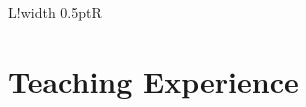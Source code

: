 \documentclass[11pt]{article}
\newcommand\VRule{\color{lightgray}\vrule width 0.5pt}
\begin{document}
\begin{flushleft}
\begin{tabular}{L!{\VRule}R}
    \end{tabular}
\end{flushleft}

\section*{Teaching Experience}
\end{document}
